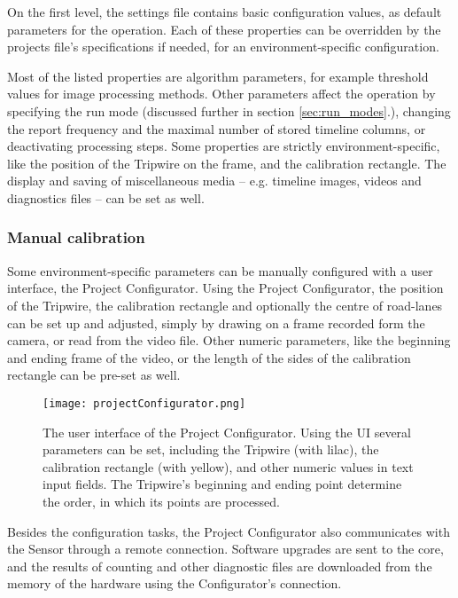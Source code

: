 On the first level, the settings file contains basic configuration values, as default parameters for the operation.
Each of these properties can be overridden by the projects file's specifications if needed, for an environment-specific configuration.

Most of the listed properties are algorithm parameters, for example threshold values for image processing methods.
Other parameters affect the operation by specifying the run mode (discussed further in section \ref{sec:run_modes}.), changing the report frequency and the maximal number of stored timeline columns, or deactivating processing steps.
Some properties are strictly environment-specific, like the position of the Tripwire on the frame, and the calibration rectangle.
The display and saving of miscellaneous media -- e.g. timeline images, videos and diagnostics files -- can be set as well.

\subsubsection{Manual calibration}
Some environment-specific parameters can be manually configured with a user interface, the Project Configurator.
Using the Project Configurator, the position of the Tripwire, the calibration rectangle and optionally the centre of road-lanes can be set up and adjusted, simply by drawing on a frame recorded form the camera, or read from the video file.
Other numeric parameters, like the beginning and ending frame of the video, or the length of the sides of the calibration rectangle can be pre-set as well.

\begin{figure}[!h]
	\centering
	\texttt{[image: projectConfigurator.png]}
	\caption{The user interface of the Project Configurator. Using the UI several parameters can be set, including the Tripwire (with lilac), the calibration rectangle (with yellow), and other numeric values in text input fields. The Tripwire's beginning and ending point determine the order, in which its points are processed. \label{fig:project_configurator}}
\end{figure}

Besides the configuration tasks, the Project Configurator also communicates with the Sensor through a remote connection.
Software upgrades are sent to the core, and the results of counting and other diagnostic files are downloaded from the memory of the hardware using the Configurator's connection.
